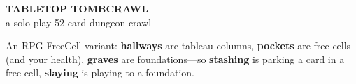 \documentclass[10pt]{article}
\newcommand{\kw}[1]{\textbf{#1}}
\begin{document}
	
	\setlength{\parskip}{1.0pt}
	\noindent
	\begin{minipage}[t]{0.40\linewidth}
		{\color{rust}\sffamily\bfseries\Large TABLETOP TOMBCRAWL}\\[1pt]
		{\color{faint}\sffamily\small a solo-play 52-card dungeon crawl}
	\end{minipage}\hfill
	\begin{minipage}[t]{0.58\linewidth}
		\raggedleft
		{\color{ink!70}\footnotesize An RPG FreeCell variant: \kw{hallways} are tableau columns, \kw{pockets} are
			free cells (and your health), \kw{graves} are foundations—so \kw{stashing} is parking a card in a free
			cell, \kw{slaying} is playing to a foundation.}
	\end{minipage}
	
\end{document}
